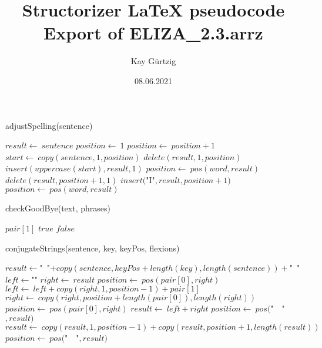 \documentclass[a4paper,10pt]{article}
\title{Structorizer LaTeX pseudocode Export of ELIZA_2.3.arrz}
\author{Kay Gürtzig}
\date{08.06.2021}
\begin{document}
\begin{algorithm}
\caption{adjustSpelling(sentence)}
\begin{algorithmic}[5]

\STATE {}
  \STATE \(result\gets\ sentence\)
  \STATE \(position\gets\ 1\)
    \STATE \(position\gets\ position+1\)
  \ENDWHILE
    \STATE \(start\gets\ copy(sentence,1,position)\)
    \STATE \(delete(result,1,position)\)
    \STATE \(insert(uppercase(start),result,1)\)
  \ENDIF
    \STATE \(position\gets\ pos(word,result)\)
      \STATE \(delete(result,position+1,1)\)
      \STATE \(insert(\)"{}I"{}\(,result,position+1)\)
      \STATE \(position\gets\ pos(word,result)\)
    \ENDWHILE
  \ENDFOR

\end{algorithmic}
\end{algorithm}


\begin{algorithm}
\caption{checkGoodBye(text, phrases)}
\begin{algorithmic}[5]

\STATE {}
\STATE {}
\STATE {}
\STATE {}
      \PRINT\(pair[1]\)
      \RETURN\(true\)
    \ENDIF
  \ENDFOR
  \RETURN\(false\)

\end{algorithmic}
\end{algorithm}


\begin{algorithm}
\caption{conjugateStrings(sentence, key, keyPos, flexions)}
\begin{algorithmic}[5]

  \STATE \(result\gets\)"{}\ "{}\(+copy(sentence,keyPos+length(key),length(sentence))+\)"{}\ "{}\(\)
    \STATE \(left\gets\)"{}"{}\(\)
    \STATE \(right\gets\ result\)
    \STATE \(position\gets\ pos(pair[0],right)\)
      \STATE \(left\gets\ left+copy(right,1,position-1)+pair[1]\)
      \STATE \(right\gets\ copy(right,position+length(pair[0]),length(right))\)
      \STATE \(position\gets\ pos(pair[0],right)\)
    \ENDWHILE
    \STATE \(result\gets\ left+right\)
  \ENDFOR
  \STATE \(position\gets\ pos(\)"{}\ \ "{}\(,result)\)
    \STATE \(result\gets\ copy(result,1,position-1)+copy(result,position+1,length(result))\)
    \STATE \(position\gets\ pos(\)"{}\ \ "{}\(,result)\)
  \ENDWHILE

\end{algorithmic}
\end{algorithm}
\end{document}
